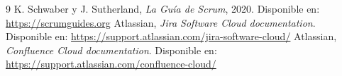 \documentclass[a4paper, 11pt]{article}
\begin{document}
\begin{thebibliography}{9}
 K. Schwaber y J. Sutherland, \textit{La Guía de Scrum}, 2020. Disponible en: \url{https://scrumguides.org}
 Atlassian, \textit{Jira Software Cloud documentation}. Disponible en: \url{https://support.atlassian.com/jira-software-cloud/}
 Atlassian, \textit{Confluence Cloud documentation}. Disponible en: \url{https://support.atlassian.com/confluence-cloud/}
\end{thebibliography}
\end{document}
